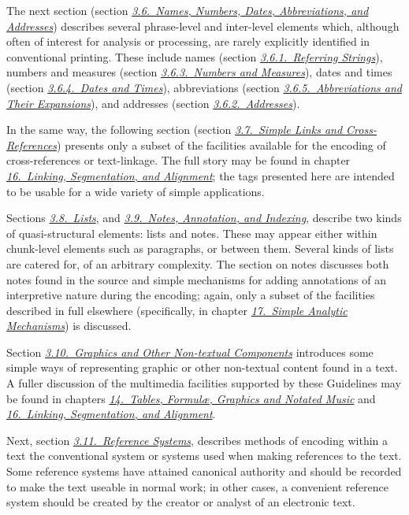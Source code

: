 The next section (section \textit{\hyperref[CONA]{3.6.\ Names, Numbers, Dates, Abbreviations, and Addresses}}) describes several phrase-level and inter-level elements which, although often of interest for analysis or processing, are rarely explicitly identified in conventional printing. These include names (section \textit{\hyperref[CONARS]{3.6.1.\ Referring Strings}}), numbers and measures (section \textit{\hyperref[CONANU]{3.6.3.\ Numbers and Measures}}), dates and times (section \textit{\hyperref[CONADA]{3.6.4.\ Dates and Times}}), abbreviations (section \textit{\hyperref[CONAAB]{3.6.5.\ Abbreviations and Their Expansions}}), and addresses (section \textit{\hyperref[CONAAD]{3.6.2.\ Addresses}}).\par
In the same way, the following section (section \textit{\hyperref[COXR]{3.7.\ Simple Links and Cross-References}}) presents only a subset of the facilities available for the encoding of cross-references or text-linkage. The full story may be found in chapter \textit{\hyperref[SA]{16.\ Linking, Segmentation, and Alignment}}; the tags presented here are intended to be usable for a wide variety of simple applications.\par
Sections \textit{\hyperref[COLI]{3.8.\ Lists}}, and \textit{\hyperref[CONO]{3.9.\ Notes, Annotation, and Indexing}}, describe two kinds of quasi-structural elements: lists and notes. These may appear either within chunk-level elements such as paragraphs, or between them. Several kinds of lists are catered for, of an arbitrary complexity. The section on notes discusses both notes found in the source and simple mechanisms for adding annotations of an interpretive nature during the encoding; again, only a subset of the facilities described in full elsewhere (specifically, in chapter \textit{\hyperref[AI]{17.\ Simple Analytic Mechanisms}}) is discussed.\par
Section \textit{\hyperref[COGR]{3.10.\ Graphics and Other Non-textual Components}} introduces some simple ways of representing graphic or other non-textual content found in a text. A fuller discussion of the multimedia facilities supported by these Guidelines may be found in chapters \textit{\hyperref[FT]{14.\ Tables, Formulæ, Graphics and Notated Music}} and \textit{\hyperref[SA]{16.\ Linking, Segmentation, and Alignment}}.\par
Next, section \textit{\hyperref[CORS]{3.11.\ Reference Systems}}, describes methods of encoding within a text the conventional system or systems used when making references to the text. Some reference systems have attained canonical authority and should be recorded to make the text useable in normal work; in other cases, a convenient reference system should be created by the creator or analyst of an electronic text.\par
